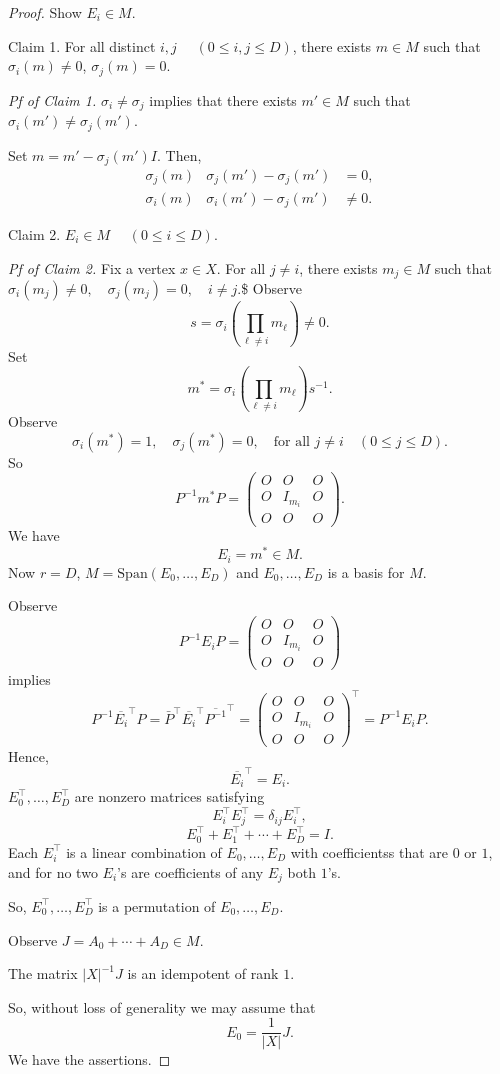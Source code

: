 \documentclass[
]{book}
\theoremstyle{definition}
\theoremstyle{definition}
\theoremstyle{definition}
\theoremstyle{definition}
\theoremstyle{remark}
\begin{document}
\begin{proof}
Show \(E_i\in M\).

Claim 1. For all distinct \(i, j\) \(\quad (0\leq i, j\leq D)\), there exists \(m\in M\) such that \(\sigma_i(m)\neq 0\), \(\sigma_j(m)=0\).

\emph{Pf of Claim 1.}
\(\sigma_i\neq \sigma_j\) implies that there exists \(m'\in M\) such that \(\sigma_i(m')\neq \sigma_j(m')\).

Set \(m = m'-\sigma_j(m')I\). Then,
\begin{align}
\sigma_j(m) & \sigma_j(m') - \sigma_j(m') & = 0,\\
\sigma_i(m) & \sigma_i(m') - \sigma_j(m') & \neq 0.
\end{align}

Claim 2. \(E_i\in M\) \(\quad (0\leq i \leq D)\).

\emph{Pf of Claim 2.}
Fix a vertex \(x\in X\). For all \(j\neq i\), there exists \(m_j\in M\) such that
\(\sigma_i(m_j)\neq 0, \quad \sigma_j(m_j) = 0, \quad i\neq j.\)\$
Observe
\[s = \sigma_i\left(\prod_{\ell\neq i}m_\ell\right) \neq 0.\]
Set
\[m^* = \sigma_i\left(\prod_{\ell\neq i}m_\ell\right) s^{-1}.\]
Observe
\[\sigma_i(m^*) =1, \quad \sigma_j(m^*) = 0, \quad \text{for all }j\neq i \quad (0\leq j\leq D).\]
So
\[P^{-1}m^*P = \begin{pmatrix} O & O & O\\
O & I_{m_i} & O\\
O & O & O \end{pmatrix}.\]
We have
\[E_i = m^*\in M.\]
Now \(r = D\), \(M = \mathrm{Span}(E_0, \ldots, E_D)\) and \(E_0, \ldots, E_D\) is a basis for \(M\).

Observe
\[P^{-1}E_iP = \begin{pmatrix} O & O & O\\
O & I_{m_i} & O\\
O & O & O \end{pmatrix}\]
implies
\[P^{-1}\overline{E_i}^\top P = \bar{P}^\top \overline{E_i}^\top \overline{P^{-1}}^\top = \begin{pmatrix} O & O & O\\
O & I_{m_i} & O\\
O & O & O \end{pmatrix}^\top = P^{-1}E_i P.\]
Hence,
\[\overline{E_i}^\top = E_i.\]
\(E_0^\top, \ldots, E_D^\top\) are nonzero matrices satisfying
\[E_i^\top E_j^\top = \delta_{ij}E_i^\top,\]
\[E_0^\top + E_1^\top + \cdots + E_D^\top = I.\]
Each \(E_i^\top\) is a linear combination of \(E_0, \ldots, E_D\) with coefficientss that are \(0\) or \(1\), and for no two \(E_i\)'s are coefficients of any \(E_j\) both \(1\)'s.

So, \(E_0^\top, \ldots, E_D^\top\) is a permutation of \(E_0, \ldots, E_D\).

Observe \(J = A_0 + \cdots + A_D\in M\).

The matrix \(|X|^{-1}J\) is an idempotent of rank \(1\).

So, without loss of generality we may assume that
\[E_0 = \frac{1}{|X|}J.\]
We have the assertions.
\end{proof}
\end{document}
